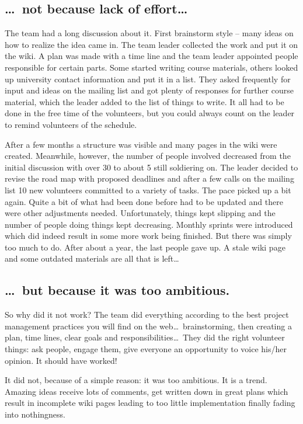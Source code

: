 \subsection*{\dots\ not because lack of effort\dots}
The team had a long discussion about it. First brainstorm style -- many ideas on
how to realize the idea came in. The team leader collected the work and put it
on the wiki. A plan was made with a time line and the team leader appointed
people responsible for certain parts. Some started writing  course materials,
others looked up university contact information and put it in a list. They asked
frequently for input and ideas on the mailing list and got plenty of responses
for further course material, which the leader added to the list of things to
write. It all had to be done in the free time of the volunteers, but you could
always count on the leader to remind volunteers of the schedule.

After a few months a structure was visible and many pages in the wiki were
created. Meanwhile, however, the number of people involved decreased from the
initial discussion with over 30 to about 5 still soldiering on. The leader
decided to revise the road map with proposed deadlines and after a few calls on
the mailing list 10 new volunteers committed to a variety of tasks. The pace
picked up a bit again. Quite a bit of what had been done before had to be
updated and there were other adjustments needed. Unfortunately, things kept
slipping and the number of people doing things kept decreasing. Monthly sprints
were introduced which did indeed result in some more work being finished. But
there was simply too much to do. After about a year, the last people gave up. A
stale wiki page and some outdated materials are all that is left\dots

\subsection*{\dots\ but because it was too ambitious.}
So why did it not work? The team did everything according to the best project
management practices you will find on the web\dots\ brainstorming, then creating
a plan, time lines, clear goals and responsibilities\dots\ They did the right
volunteer things: ask people, engage them, give everyone an opportunity to voice
his/her opinion. It should have worked!

It did not, because of a simple reason: it was too ambitious. It is a trend.
Amazing ideas receive lots of comments, get written down in great plans which
result in incomplete wiki pages leading to too little implementation finally
fading into nothingness.


